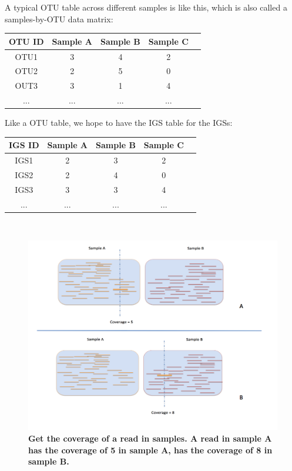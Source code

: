 A typical OTU table across different samples is like this, which is also 
called a samples-by-OTU data matrix:%
\\
\begin{tabular}{ |c | c |c| c|c| }
    OTU ID & Sample A & Sample B & Sample C \\
\hline 
OTU1 & 3 & 4 & 2  \\
OTU2 & 2 & 5 & 0 \\
OUT3 & 3 & 1 & 4 \\
...  & ... & ... & ... \\
\end{tabular}
\begin{flushleft}
\end{flushleft}

Like a OTU table, we hope to have the IGS table for the IGSs: %
\\
\begin{tabular}{ |c | c |c| c|c| }
    IGS ID & Sample A & Sample B & Sample C \\
\hline 
IGS1 & 2 & 3 & 2  \\
IGS2 & 2 & 4 & 0 \\
IGS3 & 3 & 3 & 4 \\
...  & ... & ... & ... \\
\end{tabular}
\\



\begin{figure}[!ht]
 \centerline{\includegraphics[width=7in]{./figures/read_coverage_samples.png}}
\caption{\bf Get the coverage of a read in samples. A read in sample A has the coverage of 5 in sample A, has
the coverage of 8 in sample B.}
\label{fig:read_coverage_samples}
\end{figure}



